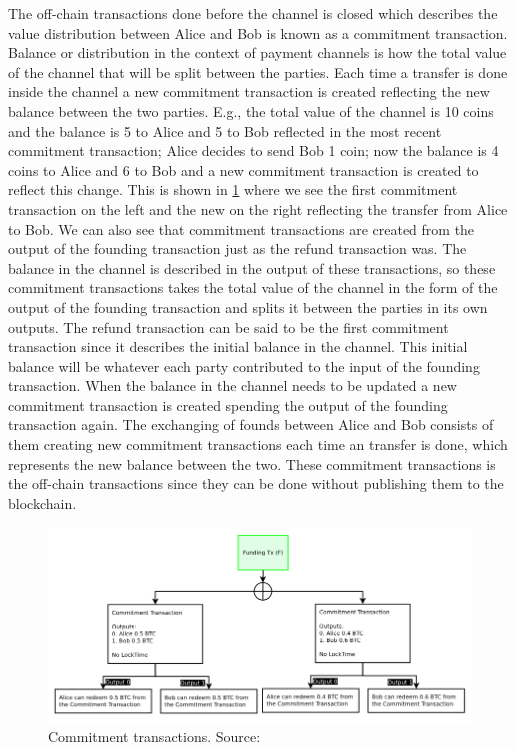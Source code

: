 The off-chain transactions done before the channel is closed which describes the value distribution between Alice and Bob is known as a commitment transaction. Balance or distribution in the context of payment channels is how the total value of the channel that will be split between the parties. Each time a transfer is done inside the channel a new commitment transaction is created reflecting the new balance between the two parties. E.g., the total value of the channel is 10 coins and the balance is 5 to Alice and 5 to Bob reflected in the most recent commitment transaction; Alice decides to send Bob 1 coin; now the balance is 4 coins to Alice and 6 to Bob and a new commitment transaction is created to reflect this change. This is shown in \cref{fig:ln_commit} where we see the first commitment transaction on the left and the new on the right reflecting the transfer from Alice to Bob. We can also see that commitment transactions are created from the output of the founding transaction just as the refund transaction was. The balance in the channel is described in the output of these transactions, so these commitment transactions takes the total value of the channel in the form of the output of the founding transaction and splits it between the parties in its own outputs. The refund transaction can be said to be the first commitment transaction since it describes the initial balance in the channel. This initial balance will be whatever each party contributed to the input of the founding transaction. 
When the balance in the channel needs to be updated a new commitment transaction is created spending the output of the founding transaction again. The exchanging of founds between Alice and Bob consists of them creating new commitment transactions each time an transfer is done, which represents the new balance between the two. These commitment transactions is the off-chain transactions since they can be done without publishing them to the blockchain.

\begin{figure}[h]
    \centering
    \includegraphics[width=12cm]{figures/ln_commit.png}
    \caption{Commitment transactions. Source: \cite{poon2015bitcoin}}
    \label{fig:ln_commit}
\end{figure}


